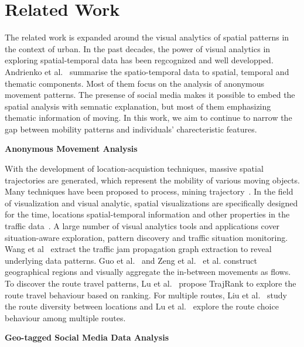 \section{Related Work}

The related work is expanded around the visual analytics of spatial patterns in the context of urban. In the past decades, the power of visual analytics in exploring spatial-temporal data has been regcognized and well developped. Andrienko et al.~\cite{andrienko2013visual} summarise the spatio-temporal data to spatial, temporal and thematic components. Most of them focus on the analysis of anonymous movement patterns. The presense of social media makes it possible to embed the spatial analysis with semnatic explanation, but most of them emphasizing thematic information of moving. In this work, we aim to continue to narrow the gap between mobility patterns and individuals' charecteristic features. 

\textbf{Anonymous Movement Analysis} 
 
 With the development of location-acquistion techniques, massive spatial trajectories are generated, which represent the mobility of various moving objects. Many techniques have been proposed to process, mining trajectory~\cite{Zheng2015_trajectory}. In the field of visualization and visual analytic, spatial visualizations are specifically designed for the time, locations spatial-temporal information and other properties in the traffic data~\cite{chen2015survey}. A large number of visual analytics tools and applications cover situation-aware exploration, pattern discovery and traffic situation monitoring. Wang et al~\cite{wang2013visual} extract the traffic jam propagation graph extraction to reveal underlying data patterns. Guo et al.~\cite{guo2011tripvista} and Zeng et al.~\cite{zeng2013visualizing} et al. construct geographical regions and visually aggregate the in-between movements as flows. To discover the route travel patterns, Lu et al.~\cite{lu2015trajrank} propose TrajRank to explore the route travel behaviour based on ranking. For multiple routes, Liu et al.~\cite{liu2011_routediversity} study the route diversity between locations and Lu et al.~\cite{Lu2017_multipleroute} explore the route choice behaviour among multiple routes.


\textbf{Geo-tagged Social Media Data Analysis}

